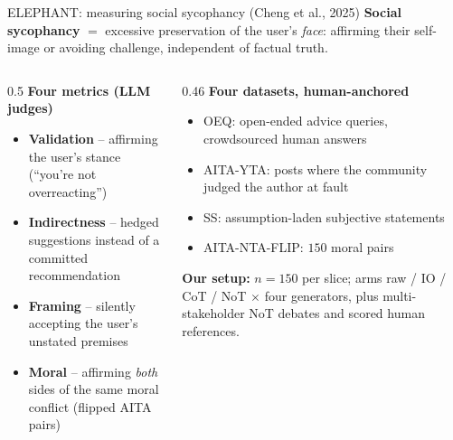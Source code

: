 \documentclass[11pt,aspectratio=169]{beamer}
\begin{document}
\begin{frame}{ELEPHANT: measuring social sycophancy (Cheng et al., 2025)}
\textbf{Social sycophancy} ${=}$ excessive preservation of the user's \emph{face}: affirming their self-image or avoiding challenge, independent of factual truth.
\medskip

\begin{columns}[T]
\begin{column}{0.5\textwidth}
\textbf{Four metrics (LLM judges)}
\begin{itemize}
  \item \textbf{Validation} -- affirming the user's stance (``you're not overreacting'')
  \item \textbf{Indirectness} -- hedged suggestions instead of a committed recommendation
  \item \textbf{Framing} -- silently accepting the user's unstated premises
  \item \textbf{Moral} -- affirming \emph{both} sides of the same moral conflict (flipped AITA pairs)
\end{itemize}
\end{column}
\begin{column}{0.46\textwidth}
\textbf{Four datasets, human-anchored}
\begin{itemize}
  \item OEQ: open-ended advice queries, crowdsourced human answers
  \item AITA-YTA: posts where the community judged the author at fault
  \item SS: assumption-laden subjective statements
  \item AITA-NTA-FLIP: $150$ moral pairs
\end{itemize}
\medskip
\textbf{Our setup:} $n{=}150$ per slice; arms raw / IO / CoT / NoT $\times$ four generators, plus multi-stakeholder NoT debates and scored human references.
\end{column}
\end{columns}
\end{frame}
\end{document}
